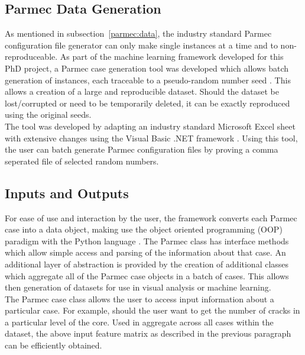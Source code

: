 \subsection{Parmec Data Generation}

As mentioned in subsection~\ref{parmec:data}, the industry standard Parmec configuration file generator can only make single instances at a time and to non-reproduceable. As part of the machine learning framework developed for this PhD project, a Parmec case generation tool was developed which allows batch generation of instances, each traceable to a pseudo-random number seed \cite{blum1982simple}. This allows a creation of a large and reproducible dataset. Should the dataset be lost/corrupted or need to be temporarily deleted, it can be exactly reproduced using the original seeds.
\\

\noindent
The tool was developed by adapting an industry standard Microsoft Excel sheet with extensive changes using the Visual Basic .NET framework \cite{grundgeiger2018programming}. Using this tool, the user can batch generate Parmec configuration files by proving a comma seperated file of selected random numbers. 
\\

\subsection{Inputs and Outputs}

\noindent
For ease of use and interaction by the user, the framework converts each Parmec case into a data object, making use the object oriented programming (OOP) paradigm \cite{meyer1997object} with the Python language \cite{deitel2002python}. The Parmec class has interface methods which allow simple access and parsing of the information about that case. An additional layer of abstraction is provided by the creation of additional classes which aggregate all of the Parmec case objects in a batch of cases. This allows then generation of datasets for use in visual analysis or machine learning.
\\

\noindent
The Parmec case class allows the user to access input information about a particular case.  For example, should the user want to get the number of cracks in a particular level of the core. Used in aggregate across all cases within the dataset, the above input feature matrix as described in the previous paragraph can be efficiently obtained. 
\\



